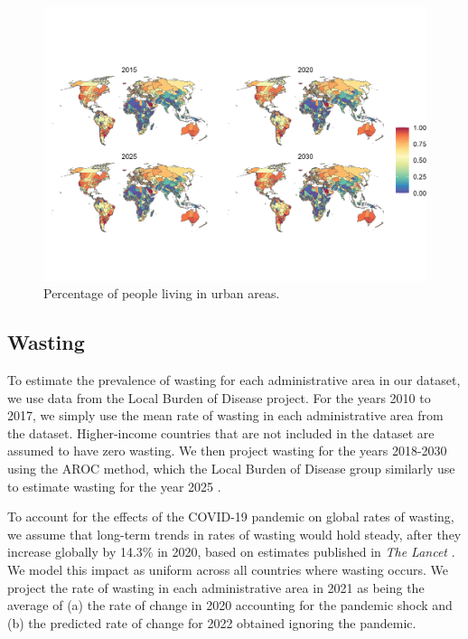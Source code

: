 \documentclass{article}
\begin{document}
\begin{figure}[H]
  \centering
  \includegraphics[width=\linewidth]{img/covars/urban_perc.png}
  \caption{Percentage of people living in urban areas.}
\end{figure}

\pagebreak
\subsection{Wasting}
To estimate the prevalence of wasting for each administrative area in our dataset, we use data from the Local Burden of Disease project.  For the years 2010 to 2017, we simply use the mean rate of wasting in each administrative area from the dataset.  Higher-income countries that are not included in the dataset are assumed to have zero wasting.  We then project wasting for the years 2018-2030 using the AROC method, which the Local Burden of Disease group similarly use to estimate wasting for the year 2025 \citep{Local2020}.

To account for the effects of the COVID-19 pandemic on global rates of wasting, we assume that long-term trends in rates of wasting would hold steady, after they increase globally by 14.3\% in 2020, based on estimates published in \textit{The Lancet} \citep{headey2020impacts}.  We model this impact as uniform across all countries where wasting occurs.  We project the rate of wasting in each administrative area in 2021 as being the average of (a) the rate of change in 2020 accounting for the pandemic shock and (b) the predicted rate of change for 2022 obtained ignoring the pandemic.
\end{document}
